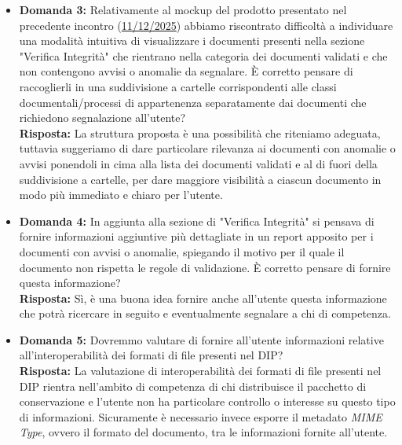 \documentclass[a4paper,12pt]{article}
\begin{document}
\begin{itemize}
    \item \textbf{Domanda 3:} Relativamente al mockup del prodotto presentato nel precedente incontro (\href{https://cdn.jsdelivr.net/gh/7-ZPUs/Docs@vverbali_in_lavorazione/2_RTB/Verbali/Verbali%20Esterni/2025-12-11-VerbaleEsterno.pdf}{11/12/2025}) abbiamo riscontrato difficoltà a individuare una modalità intuitiva di visualizzare i documenti presenti nella sezione "Verifica Integrità" che rientrano nella categoria dei documenti validati e che non contengono avvisi o anomalie da segnalare. È corretto pensare di raccoglierli in una suddivisione a cartelle corrispondenti alle classi documentali/processi di appartenenza separatamente dai documenti che richiedono segnalazione all'utente?
    \\ \textbf{Risposta:} La struttura proposta è una possibilità che riteniamo adeguata, tuttavia suggeriamo di dare particolare rilevanza ai documenti con anomalie o avvisi ponendoli in cima alla lista dei documenti validati e al di fuori della suddivisione a cartelle, per dare maggiore visibilità a ciascun documento in modo più immediato e chiaro per l'utente.

    \item \textbf{Domanda 4:} In aggiunta alla sezione di "Verifica Integrità" si pensava di fornire informazioni aggiuntive più dettagliate in un report apposito per i documenti con avvisi o anomalie, spiegando il motivo per il quale il documento non rispetta le regole di validazione. È corretto pensare di fornire questa informazione?
    \\ \textbf{Risposta:} Sì, è una buona idea fornire anche all'utente questa informazione che potrà ricercare in seguito e eventualmente segnalare a chi di competenza.

    \item \textbf{Domanda 5:} Dovremmo valutare di fornire all'utente informazioni relative all'interoperabilità dei formati di file presenti nel DIP?
    \\ \textbf{Risposta:} La valutazione di interoperabilità dei formati di file presenti nel DIP rientra nell'ambito di competenza di chi distribuisce il pacchetto di conservazione e l'utente non ha particolare controllo o interesse su questo tipo di informazioni. Sicuramente è necessario invece esporre il metadato \textit{MIME Type}, ovvero il formato del documento, tra le informazioni fornite all'utente.


\end{itemize}
\end{document}
